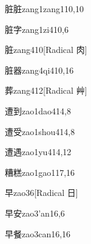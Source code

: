 \begin{verbete}{脏脏}{zang1zang1}{10,10}
\end{verbete}

\begin{verbete}{脏字}{zang1zi4}{10,6}
\end{verbete}

\begin{verbete}{脏}{zang4}{10}[Radical 肉]
\end{verbete}

\begin{verbete}{脏器}{zang4qi4}{10,16}
\end{verbete}

\begin{verbete}{葬}{zang4}{12}[Radical 艸]
\end{verbete}

\begin{verbete}{遭到}{zao1dao4}{14,8}
\end{verbete}

\begin{verbete}{遭受}{zao1shou4}{14,8}
\end{verbete}

\begin{verbete}{遭遇}{zao1yu4}{14,12}
\end{verbete}

\begin{verbete}{糟糕}{zao1gao1}{17,16}
\end{verbete}

\begin{verbete}{早}{zao3}{6}[Radical 日]
\end{verbete}

\begin{verbete}{早安}{zao3'an1}{6,6}
\end{verbete}

\begin{verbete}{早餐}{zao3can1}{6,16}
\end{verbete}

